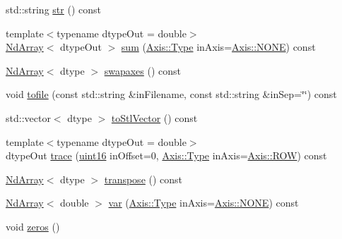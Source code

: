 \begin{DoxyCompactItemize}
\item 
std\+::string \mbox{\hyperlink{class_num_cpp_1_1_nd_array_ae4bf4e49cff56be827810fcfffcb21e5}{str}} () const
\item 
{\footnotesize template$<$typename dtype\+Out  = double$>$ }\\\mbox{\hyperlink{class_num_cpp_1_1_nd_array}{Nd\+Array}}$<$ dtype\+Out $>$ \mbox{\hyperlink{class_num_cpp_1_1_nd_array_a6952d83d0f935223e2b6b63c8a84f18c}{sum}} (\mbox{\hyperlink{struct_num_cpp_1_1_axis_ac10eb76f8631762d9ed70c40c42ca6cb}{Axis\+::\+Type}} in\+Axis=\mbox{\hyperlink{struct_num_cpp_1_1_axis_ac10eb76f8631762d9ed70c40c42ca6cba747ae657022cca1d87702b56d0c038e9}{Axis\+::\+N\+O\+NE}}) const
\item 
\mbox{\hyperlink{class_num_cpp_1_1_nd_array}{Nd\+Array}}$<$ dtype $>$ \mbox{\hyperlink{class_num_cpp_1_1_nd_array_a7f669c50940c145fc36e3f6772c2df94}{swapaxes}} () const
\item 
void \mbox{\hyperlink{class_num_cpp_1_1_nd_array_ab0c57367e4bb1ba6da16179ce17e2bbe}{tofile}} (const std\+::string \&in\+Filename, const std\+::string \&in\+Sep=\char`\"{}\char`\"{}) const
\item 
std\+::vector$<$ dtype $>$ \mbox{\hyperlink{class_num_cpp_1_1_nd_array_afefe67a36969049996d3c8743a61ef36}{to\+Stl\+Vector}} () const
\item 
{\footnotesize template$<$typename dtype\+Out  = double$>$ }\\dtype\+Out \mbox{\hyperlink{class_num_cpp_1_1_nd_array_a8299e1130a115fbf21568ed9ca9bce5b}{trace}} (\mbox{\hyperlink{namespace_num_cpp_a3078cddd091529b8dd3e7828fa9a9926}{uint16}} in\+Offset=0, \mbox{\hyperlink{struct_num_cpp_1_1_axis_ac10eb76f8631762d9ed70c40c42ca6cb}{Axis\+::\+Type}} in\+Axis=\mbox{\hyperlink{struct_num_cpp_1_1_axis_ac10eb76f8631762d9ed70c40c42ca6cbad9f2ab1396aad2412d9c77fbcbbe6aca}{Axis\+::\+R\+OW}}) const
\item 
\mbox{\hyperlink{class_num_cpp_1_1_nd_array}{Nd\+Array}}$<$ dtype $>$ \mbox{\hyperlink{class_num_cpp_1_1_nd_array_a017f44fb835480793546da61477f3e61}{transpose}} () const
\item 
\mbox{\hyperlink{class_num_cpp_1_1_nd_array}{Nd\+Array}}$<$ double $>$ \mbox{\hyperlink{class_num_cpp_1_1_nd_array_a5af94d5d0410ea444b669b972389374a}{var}} (\mbox{\hyperlink{struct_num_cpp_1_1_axis_ac10eb76f8631762d9ed70c40c42ca6cb}{Axis\+::\+Type}} in\+Axis=\mbox{\hyperlink{struct_num_cpp_1_1_axis_ac10eb76f8631762d9ed70c40c42ca6cba747ae657022cca1d87702b56d0c038e9}{Axis\+::\+N\+O\+NE}}) const
\item 
void \mbox{\hyperlink{class_num_cpp_1_1_nd_array_a6d355000bd8adc8c6811d7c5dd4b0bcd}{zeros}} ()
\end{DoxyCompactItemize}
